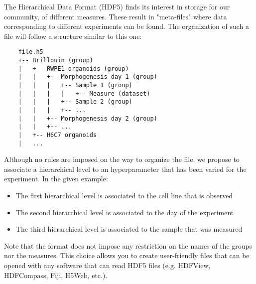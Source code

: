 The Hierarchical Data Format (HDF5) finds its interest in storage for our community, of different measures. These result in "meta-files" where data corresponding to different experiments can be found. The organization of such a file will follow a structure similar to this one:

\begin{verbatim}
    file.h5
    +-- Brillouin (group)
    |   +-- RWPE1 organoids (group)
    |   |   +-- Morphogenesis day 1 (group)
    |   |   |   +-- Sample 1 (group)
    |   |   |   |   +-- Measure (dataset)
    |   |   |   +-- Sample 2 (group)
    |   |   |   +-- ...
    |   |   +-- Morphogenesis day 2 (group)
    |   |   +-- ...
    |   +-- H6C7 organoids
    |   ...
\end{verbatim}

Although no rules are imposed on the way to organize the file, we propose to associate a hierarchical level to an hyperparameter that has been varied for the experiment. In the given example:
\begin{itemize}
    \item The first hierarchical level is associated to the cell line that is observed
    \item The second hierarchical level is associated to the day of the experiment
    \item The third hierarchical level is associated to the sample that was measured
\end{itemize}

Note that the format does not impose any restriction on the names of the groups nor the measures. This choice allows you to create user-friendly files that can be opened with any software that can read HDF5 files (e.g. HDFView, HDFCompass, Fiji, H5Web, etc.).
